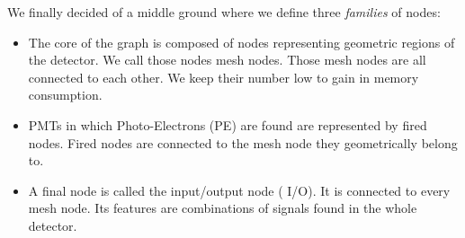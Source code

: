 \documentclass[../main.tex]{subfiles}
\begin{document}



We finally decided of a middle ground where we define three \textit{families} of nodes:
\begin{itemize}
  \item The core of the graph is composed of nodes representing geometric regions of the detector. We call those nodes {\color{Dandelion} mesh} nodes. Those mesh nodes are all connected to each other. We keep their number low to gain in memory consumption.
  \item PMTs in which Photo-Electrons (PE) are found are represented by {\color{red} fired} nodes. Fired nodes are connected to the mesh node they geometrically belong to.
  \item A final node is called the input/output node ({\color{blue} I/O}). It is connected to every mesh node.  Its features are combinations of signals found in the whole detector.
\end{itemize}
\end{document}
